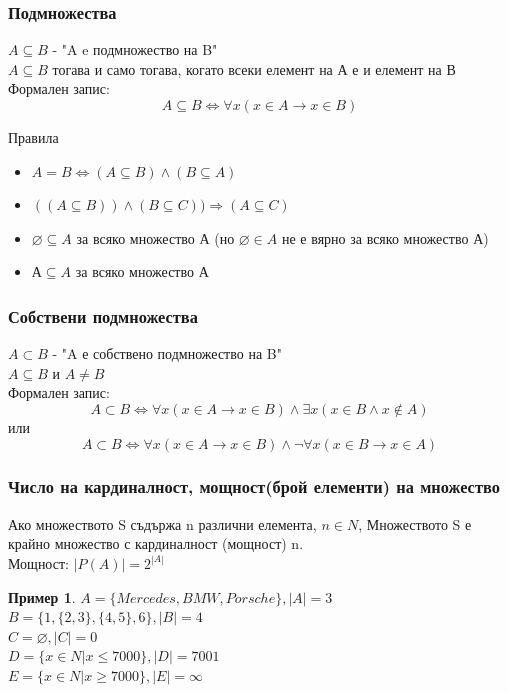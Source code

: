 \documentclass[fleqn, 12pt]{article}
\theoremstyle{definition}
\newtheorem{example}{Пример}[subsection]
\begin{document}
\subsubsection{Подмножества}
$A \subseteq B$ - "A e подмножество на B"\\
$A \subseteq B$ тогава и само тогава, когато всеки елемент на А е и елемент на В\\
Формален запис:
$$A \subseteq B \Leftrightarrow \forall x (x \in A \rightarrow x \in B )$$

\newpage
Правила
\begin{itemize}
	\item $A = B \Leftrightarrow (A \subseteq B) \land (B \subseteq A)$
	\item $((A \subseteq B)) \land (B \subseteq C)) \Rightarrow (A \subseteq C) $
	\item $\varnothing \subseteq A$ за всяко множество А (но $\varnothing \in A$ не е вярно за всяко множество А)
	\item $А \subseteq A$ за всяко множество А
\end{itemize}

\subsubsection{Собствени подмножества}
$A \subset B$ - "A е собствено подмножество на B"\\
$A \subseteq B$ и $A \neq B$\\
Формален запис:
$$A \subset B \Leftrightarrow \forall x (x \in A \rightarrow x \in B ) \land \exists x (x \in B \land x \notin A)$$
или
$$A \subset B \Leftrightarrow \forall x (x \in A \rightarrow x \in B ) \land \neg \forall x (x \in B \rightarrow x \in A)$$

\subsubsection{Число на кардиналност, мощност(брой елементи)  на множество}
Ако множеството S съдържа n различни елемента, $n \in N$, Множеството S е крайно множество с кардиналност (мощност) n.\\
Мощност: $|P(A)| = 2^{|A|}$ 
\begin{example}
$A = \{Mercedes, BMW, Porsche\}, |A| = 3 $\\
$B = \{1, \{2, 3\}, \{4, 5\}, 6\}, |B| = 4 $\\
$C = \varnothing, |C| = 0 $ \\
$D = \{x \in N | x \leq 7000\}, |D| = 7001$\\
$E = \{x \in N | x \geq 7000\}, |E| = \infty$\\
\end{example}
\end{document}
